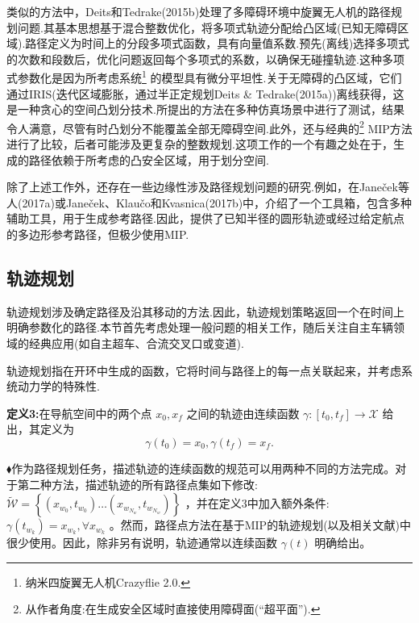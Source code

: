 \documentclass[10pt]{article}
\begin{document}
类似的方法中，Deits和Tedrake(2015b)处理了多障碍环境中旋翼无人机的路径规划问题.其基本思想基于混合整数优化，将多项式轨迹分配给凸区域(已知无障碍区域).路径定义为时间上的分段多项式函数，具有向量值系数.预先(离线)选择多项式的次数和段数后，优化问题返回每个多项式的系数，以确保无碰撞轨迹.这种多项式参数化是因为所考虑系统\footnote{纳米四旋翼无人机Crazyflie 2.0.} 的模型具有微分平坦性.关于无障碍的凸区域，它们通过IRIS(迭代区域膨胀，通过半正定规划Deits \& Tedrake(2015a))离线获得，这是一种贪心的空间凸划分技术.所提出的方法在多种仿真场景中进行了测试，结果令人满意，尽管有时凸划分不能覆盖全部无障碍空间.此外，还与经典的\footnote{从作者角度:在生成安全区域时直接使用障碍面(“超平面”).} MIP方法进行了比较，后者可能涉及更复杂的整数规划.这项工作的一个有趣之处在于，生成的路径依赖于所考虑的凸安全区域，用于划分空间.

除了上述工作外，还存在一些边缘性涉及路径规划问题的研究.例如，在Janeček等人(2017a)或Janeček、Klaučo和Kvasnica(2017b)中，介绍了一个工具箱，包含多种辅助工具，用于生成参考路径.因此，提供了已知半径的圆形轨迹或经过给定航点的多边形参考路径，但极少使用MIP.

\subsection{轨迹规划}

轨迹规划涉及确定路径及沿其移动的方法.因此，轨迹规划策略返回一个在时间上明确参数化的路径.本节首先考虑处理一般问题的相关工作，随后关注自主车辆领域的经典应用(如自主超车、合流交叉口或变道).

轨迹规划指在开环中生成的函数，它将时间与路径上的每一点关联起来，并考虑系统动力学的特殊性.

\vspace{1 em}
\textbf{定义3:}在导航空间中的两个点 \({x}_{0},{x}_{f}\) 之间的轨迹由连续函数 \(\gamma  : \left\lbrack  {{t}_{0},{t}_{f}}\right\rbrack   \rightarrow  \mathcal{X}\) 给出，其定义为
\begin{equation}
\gamma \left( {t}_{0}\right)  = {x}_{0},\gamma \left( {t}_{f}\right)  = {x}_{f}.
\end{equation}

\noindent$\blacklozenge$\hspace{1.3em}作为路径规划任务，描述轨迹的连续函数的规范可以用两种不同的方法完成。对于第二种方法，描述轨迹的所有路径点集如下修改: \(\widetilde{\mathcal{W}} = \left\{  {\left( {{x}_{{w}_{0}},{t}_{{w}_{0}}}\right) \ldots \left( {{x}_{{w}_{{N}_{w}}},{t}_{{w}_{{N}_{w}}}}\right) }\right\}\) ，并在定义3中加入额外条件: \(\gamma \left( {t}_{{w}_{k}}\right)  = {x}_{{w}_{k}},\forall {x}_{{w}_{k}}\) 。然而，路径点方法在基于MIP的轨迹规划(以及相关文献)中很少使用。因此，除非另有说明，轨迹通常以连续函数 \(\gamma \left( t\right)\) 明确给出。
\end{document}
